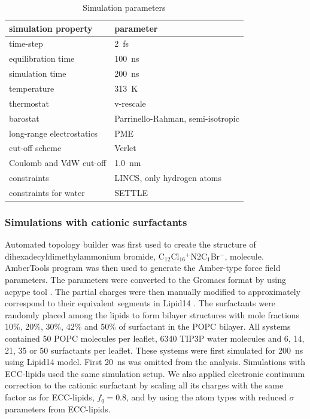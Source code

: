 \documentclass[aip,jcp,twocolumn]{revtex4}
\begin{document}
\begin{table}[btp]
  \caption{Simulation parameters}
  \label{tbl:mdpar}
  \begin{tabular}{ll}
    simulation property & parameter   \\
    \hline
    time-step           & 2~fs         \\
    equilibration time  & 100~ns  \\
    simulation time     & 200~ns  \\
    temperature         & 313~K       \\
    thermostat          & v-rescale  \cite{bussi07}   \\
    barostat            & Parrinello-Rahman, semi-isotropic \cite{parrinello81} \\
    long-range electrostatics & PME  \cite{darden93}  \\
    cut-off scheme      & Verlet \cite{Pall13}      \\
    Coulomb and VdW cut-off & 1.0~nm \\
    constraints         & LINCS, only hydrogen atoms \cite{hess97} \\
    constraints for water & SETTLE  \cite{miyamoto92} \\
    \hline
  \end{tabular}
\end{table}


\subsubsection{Simulations with cationic surfactants}
Automated topology builder \cite{malde11} was first used to create the structure of
dihexadecyldimethylammonium bromide, C$_{12}$Cl$_{16}$$^+$N2C$_1$Br$^-$, molecule.
AmberTools program \cite{amber} was then used to generate the Amber-type force field
parameters. The parameters were converted to the Gromacs format by using
acpype tool \cite{acpype}. The partial charges were then manually modified
to approximately correspond to their equivalent segments in Lipid14 \cite{dickson14}.
The surfactants were randomly placed among the lipids to form bilayer structures with
mole fractions 10\%, 20\%, 30\%, 42\% and 50\% of surfactant in the POPC bilayer.
All systems contained 50 POPC molecules per leaflet, 6340 TIP3P water molecules and
6, 14, 21, 35 or 50 surfactants per leaflet.
These systems were first simulated for 200~ns using Lipid14 model.
First 20~ns was omitted from the analysis. 
Simulations with ECC-lipids used the same simulation setup.
We also applied electronic continuum correction to the cationic surfactant 
by scaling all its charges with the same factor as for ECC-lipids, $f_q=0.8$, 
and by using the atom types with reduced $\sigma$ parameters from ECC-lipids. 
\end{document}

